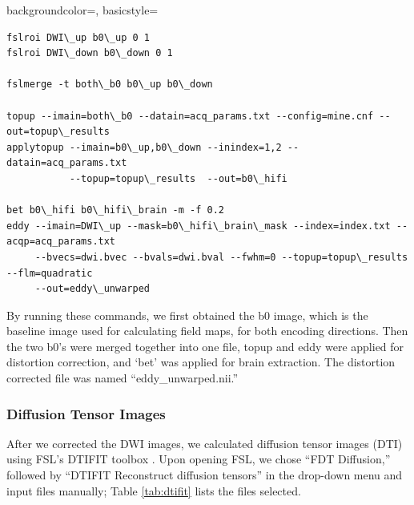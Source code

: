 {
    backgroundcolor=\color{white},
    basicstyle=\scriptsize\color{black}\ttfamily
}

\begin{lstlisting}[style=DOS]
fslroi DWI\_up b0\_up 0 1
fslroi DWI\_down b0\_down 0 1

fslmerge -t both\_b0 b0\_up b0\_down

topup --imain=both\_b0 --datain=acq_params.txt --config=mine.cnf --out=topup\_results
applytopup --imain=b0\_up,b0\_down --inindex=1,2 --datain=acq_params.txt
           --topup=topup\_results  --out=b0\_hifi

bet b0\_hifi b0\_hifi\_brain -m -f 0.2
eddy --imain=DWI\_up --mask=b0\_hifi\_brain\_mask --index=index.txt --acqp=acq_params.txt
     --bvecs=dwi.bvec --bvals=dwi.bval --fwhm=0 --topup=topup\_results --flm=quadratic
     --out=eddy\_unwarped

\end{lstlisting}

By running these commands, we first obtained the b0 image, which is the baseline image used for calculating field maps, for both encoding directions. Then the two b0's were merged together into one file, topup and eddy were applied for distortion correction, and `bet' was applied for brain extraction. The distortion corrected file was named ``eddy\_unwarped.nii.''

\subsubsection{Diffusion Tensor Images}

After we corrected the DWI images, we calculated diffusion tensor images (DTI) using FSL's DTIFIT toolbox \cite{ref:dtifit}. Upon opening FSL, we chose ``FDT Diffusion,'' followed by ``DTIFIT Reconstruct diffusion tensors'' in the drop-down menu and input files manually; Table \ref{tab:dtifit} lists the files selected.

